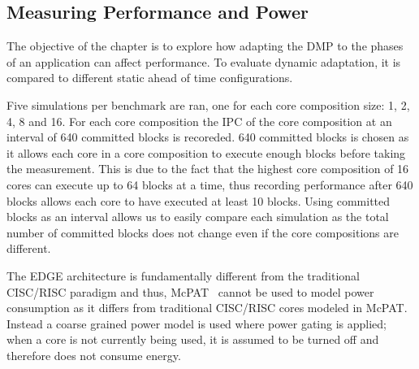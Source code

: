 \subsection{Measuring Performance and Power}

The objective of the chapter is to explore how adapting the DMP to the phases of an application can affect performance.
To evaluate dynamic adaptation, it is compared to different static ahead of time configurations.

Five simulations per benchmark are ran, one for each core composition size: 1, 2, 4, 8 and 16.
For each core composition the IPC of the core composition at an interval of 640 committed blocks is recoreded.
640 committed blocks is chosen as it allows each core in a core composition to execute enough blocks before taking the measurement.
This is due to the fact that the highest core composition of 16 cores can execute up to 64 blocks at a time, thus recording performance after 640 blocks allows each core to have executed at least 10 blocks.
Using committed blocks as an interval allows us to easily compare each simulation as the total number of committed blocks does not change even if the core compositions are different.

The EDGE architecture is fundamentally different from the traditional CISC/RISC paradigm and thus, McPAT~\cite{mcpat} cannot be used to model power consumption as it differs from traditional CISC/RISC cores modeled in McPAT.
Instead a coarse grained power model is used where power gating is applied; when a core is not currently being used, it is assumed to be turned off and therefore does not consume energy.